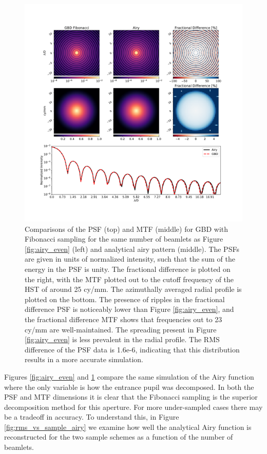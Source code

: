 \begin{figure}[H]
    \centering
    \includegraphics[width=\textwidth]{Airy_compare_Fib.pdf}
    \caption{Comparisons of the PSF (top) and MTF (middle) for GBD with Fibonacci sampling for the same number of beamlets as Figure \ref{fig:airy_even} (left) and analytical airy pattern (middle). The PSFs are given in units of normalized intensity, such that the sum of the energy in the PSF is unity. The fractional difference is plotted on the right, with the MTF plotted out to the cutoff frequency of the HST of around 25 cy/mm. The azimuthally averaged radial profile is plotted on the bottom. The presence of ripples in the fractional difference PSF is noticeably lower than Figure \ref{fig:airy_even}, and the fractional difference MTF shows that frequencies out to 23 cy/mm are well-maintained. The spreading present in Figure \ref{fig:airy_even} is less prevalent in the radial profile. The RMS difference of the PSF data is 1.6e-6, indicating that this distribution results in a more accurate simulation.}
    \label{fig:airy_fib}
\end{figure}

Figures \ref{fig:airy_even} and \ref{fig:airy_fib} compare the same simulation of the Airy function where the only variable is how the entrance pupil was decomposed. In both the PSF and MTF dimensions it is clear that the Fibonacci sampling is the superior decomposition method for this aperture. For more under-sampled cases there may be a tradeoff in accuracy. To understand this, in Figure \ref{fig:rms_vs_sample_airy} we examine how well the analytical Airy function is reconstructed for the two sample schemes as a function of the number of beamlets.

